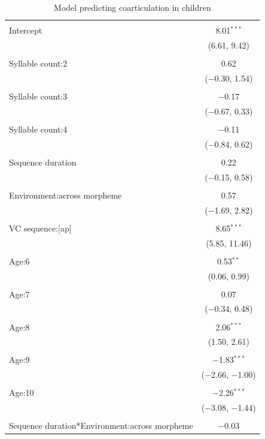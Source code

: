 \documentclass[
]{article}
\begin{document}
\begin{table}[!htbp] \centering 
  \caption{Model predicting coarticulation in children} 
  \label{} 
\begin{tabular}{@{\extracolsep{5pt}}lc} 
\\[-1.8ex]\hline 
\hline \\[-1.8ex] 
 Intercept & 8.01$^{***}$ \\ 
  & (6.61, 9.42) \\ 
  & \\ 
 Syllable count:2 & 0.62 \\ 
  & ($-$0.30, 1.54) \\ 
  & \\ 
 Syllable count:3 & $-$0.17 \\ 
  & ($-$0.67, 0.33) \\ 
  & \\ 
 Syllable count:4 & $-$0.11 \\ 
  & ($-$0.84, 0.62) \\ 
  & \\ 
 Sequence duration & 0.22 \\ 
  & ($-$0.15, 0.58) \\ 
  & \\ 
 Environment:across morpheme & 0.57 \\ 
  & ($-$1.69, 2.82) \\ 
  & \\ 
 VC sequence:[ap] & 8.65$^{***}$ \\ 
  & (5.85, 11.46) \\ 
  & \\ 
 Age:6 & 0.53$^{**}$ \\ 
  & (0.06, 0.99) \\ 
  & \\ 
 Age:7 & 0.07 \\ 
  & ($-$0.34, 0.48) \\ 
  & \\ 
 Age:8 & 2.06$^{***}$ \\ 
  & (1.50, 2.61) \\ 
  & \\ 
 Age:9 & $-$1.83$^{***}$ \\ 
  & ($-$2.66, $-$1.00) \\ 
  & \\ 
 Age:10 & $-$2.26$^{***}$ \\ 
  & ($-$3.08, $-$1.44) \\ 
  & \\ 
 Sequence duration*Environment:across morpheme & $-$0.03 \\ 

\end{tabular}
\end{table}
\end{document}
